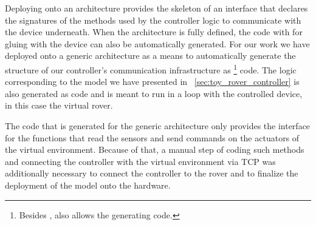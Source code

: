 Deploying onto an architecture provides the skeleton of an interface that
declares the signatures of the methods used by the controller logic to
communicate with the device underneath. When the architecture is fully defined,
the code with for gluing with the device can also be automatically generated.
For our work we have deployed onto a generic architecture as a means to
automatically generate the structure of our controller's communication
infrastructure as \clang\footnote{Besides \clang, \af also allows the generating
\java code.} code. The logic corresponding to the model we have presented in
\sect~\ref{sec:toy_rover_controller} is also generated as \clang code and is
meant to run in a loop with the controlled device, in this case the virtual
rover.

The \clang code that is generated for the generic architecture only provides the
interface for the functions that read the sensors and send commands on the
actuators of the virtual environment. Because of that, a manual step of
coding such methods and connecting the controller with the virtual environment
via TCP was additionally necessary to connect the controller to the rover and to
finalize the deployment of the model onto the hardware.


